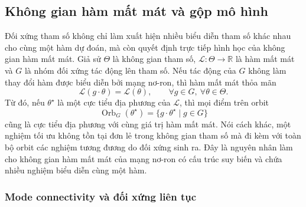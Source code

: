 \subsection{Không gian hàm mất mát và gộp mô hình}
\label{subsec:loss-landscape}

Đối xứng tham số không chỉ làm xuất hiện nhiều biểu diễn tham số khác nhau cho cùng một hàm dự đoán, mà còn quyết định trực tiếp hình học của không gian hàm mất mát. Giả sử $\Theta$ là không gian tham số, $\mathcal{L}: \Theta \rightarrow \mathbb{R}$ là hàm mất mát và $G$ là nhóm đối xứng tác động lên tham số. Nếu tác động của $G$ không làm thay đổi hàm được biểu diễn bởi mạng nơ-ron, thì hàm mất mát thỏa mãn
\begin{equation}
    \mathcal{L}(g \cdot \theta) = \mathcal{L}(\theta),
    \qquad \forall g \in G, \ \forall \theta \in \Theta.
    \label{eq:loss-symmetry-invariance}
\end{equation}
Từ đó, nếu $\theta^\star$ là một cực tiểu địa phương của $\mathcal{L}$, thì mọi điểm trên orbit
\begin{equation}
    \operatorname{Orb}_{G}(\theta^\star)
    =
    \{g \cdot \theta^\star \mid g \in G\}
    \label{eq:parameter-orbit-minima}
\end{equation}
cũng là cực tiểu địa phương với cùng giá trị hàm mất mát. Nói cách khác, một nghiệm tối ưu không tồn tại đơn lẻ trong không gian tham số mà đi kèm với toàn bộ orbit các nghiệm tương đương do đối xứng sinh ra. Đây là nguyên nhân làm cho không gian hàm mất mát của mạng nơ-ron có cấu trúc suy biến và chứa nhiều nghiệm biểu diễn cùng một hàm.

\subsubsection{Mode connectivity và đối xứng liên tục}

